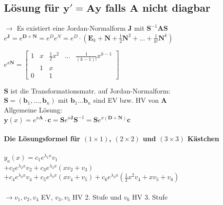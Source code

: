 \documentclass[6pt,a4paper]{scrartcl}
\newcommand{\mat}[1]{\ensuremath{\begin{bmatrix} #1 \end{bmatrix}}}								%
\newcommand{\ma}[1]{\ensuremath{\boldsymbol {#1}}}												%
\renewcommand{\vec}[1]{\ensuremath{\boldsymbol {#1}}}											%
\newcommand{\ra}[0]{\ensuremath{\rightarrow}} 									%
\newcommand{\bs}[1]{\ensuremath{\boldsymbol{#1}}}								%
\begin{document}
\begin{multicols*}{4}
\subsection{Lösung für $\bs y' = \bs A \bs y$ falls $\bs A$ nicht diagbar}
$\ra$	Es existiert eine Jordan-Normalform $\ma J$ mit $\ma S^{-1} \ma A \ma S$\\


$e^{\ma J} = e^{\ma D + \ma N} = e^{D} e^{N} = e^D \cdot (\ma E_k + \ma N + \frac{1}{2} \ma N^2 + ... + \frac{1}{k!} \ma N^k)$

$e^{x\ma N} =  \mat{1 & x & \frac{1}{2} x^2 & ... & \frac{1}{(k-1)!} x^{k-1} \\ & 1 & x & & \\ 0 & & 1 & }$

$\ma S$ ist die Transformationsmatr. auf Jordan-Normalform: \\
$\ma S = (\vec b_1, ..., \vec b_n)$ mit $\vec b_1 \ldots \vec b_n$ sind EV bzw. HV von $\ma A$
\\


Allgemeine Lösung: \\
$\boxed{\vec y(x) = e^{x \ma A} \cdot \vec c = \ma S e^{x \ma J} \ma S^{-1} = \ma S e^{x(\ma D + \ma N)} \vec c}$

\paragraph{Die Lösungsformel für $(1 \times 1)$, $(2 \times 2)$ und $(3 \times 3)$ Kästchen}

$y_a (x) = c_1 e^{\lambda_1 x} v_1$ \\
$+ c_2 e^{\lambda_2 x} v_2 + c_3 e^{\lambda_2 x}(xv_2 + v_3)$ \\
$+ c_4 e^{\lambda_3 x} v_4 + c_5 e^{\lambda_3 x}(xv_4 + v_5) + c_6 e^{\lambda_3 x} (\frac{1}{2} x^2 v_4 + xv_5 + v_6)$ \\
\\ \ra  $v_1, v_2, v_4$ EV, $v_3, v_5$ HV 2. Stufe und $v_6$ HV 3. Stufe


\end{multicols*}
\end{document}
